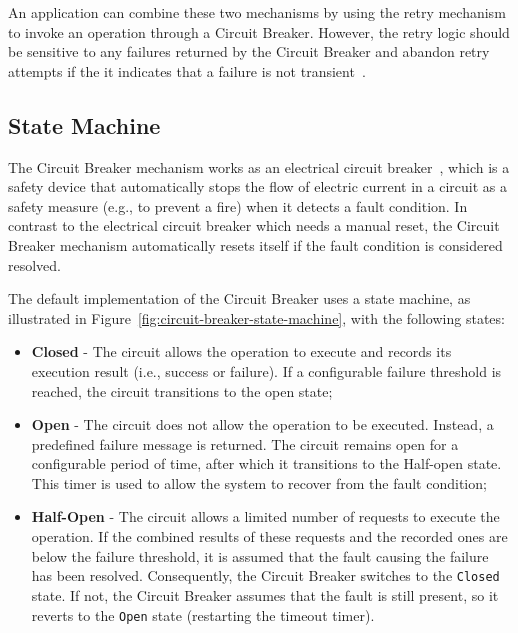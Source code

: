 An application can combine these two mechanisms by using the retry mechanism to invoke an operation through a Circuit Breaker.
However,
the retry logic should be sensitive to any failures returned by the Circuit Breaker
and abandon retry attempts
if the it indicates that a failure is not transient~\cite{microsoft-cbreaker-pattern}.

\subsection{State Machine}\label{subsec:cbreaker-state-machine}

The Circuit Breaker mechanism works as an electrical circuit breaker~\cite{electrical-circuit-breaker},
which is a safety device that automatically stops the flow of electric current in a circuit as a safety measure
(e.g., to prevent a fire) when it detects a fault condition.
In contrast to the electrical circuit breaker which needs a manual reset,
the Circuit Breaker mechanism automatically resets itself if the fault condition is considered resolved.

The default implementation of the Circuit Breaker uses a state machine,
as illustrated in Figure~\ref{fig:circuit-breaker-state-machine}, with the following states:

\begin{itemize}
    \item \textbf{Closed} - The circuit allows the operation to execute and records its execution result
    (i.e., success or failure).
    If a configurable failure threshold is reached, the circuit transitions to the open state;
    \item \textbf{Open} - The circuit does not allow the operation to be executed.
    Instead, a predefined failure message is returned.
    The circuit remains open for a configurable period of time, after which it transitions to the Half-open state.
    This timer is used to allow the system to recover from the fault condition;
    \item \textbf{Half-Open} - The circuit allows a limited number of requests to execute the operation.
    If the combined results of these requests and the recorded ones are below the failure threshold, it is assumed that the fault causing the failure has been resolved.
    Consequently, the Circuit Breaker switches to the \texttt{Closed} state.
    If not,
    the Circuit Breaker assumes that the fault is still present,
    so it reverts to the \texttt{Open} state (restarting the timeout timer).
\end{itemize}

